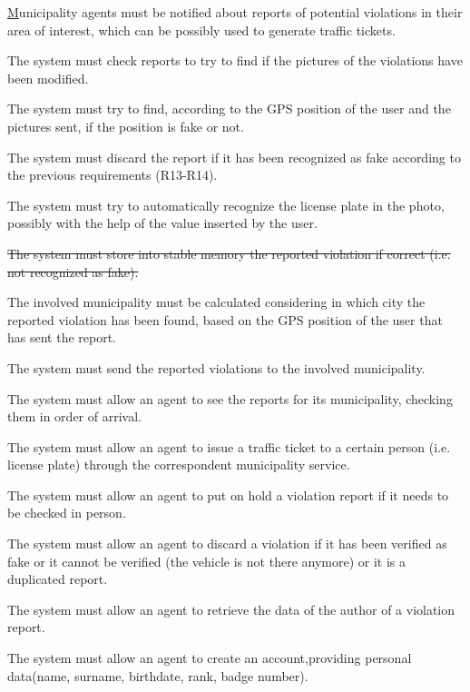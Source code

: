 \documentclass[a4paper]{report}
\begin{document}
\begin{enumerate}[start=1,label={[G\arabic*]}]
\item \hyperref[G2] Municipality agents must be notified about reports of potential violations in their area of interest, which can be possibly used to generate traffic tickets.	
\begin{enumerate}[start=13,label={[R\arabic*]}]
\item \label{R13}The system must check reports to try to find if the pictures of the violations have been modified.
\item \label{R14}The system must try to find, according to the GPS position of the user and the pictures sent, if the position is fake or not.
\item \label{R15}The system must discard the report if it has been recognized as fake according to the previous requirements (R13-R14).
\item \label{R16}The system must try to automatically recognize the license plate in the photo, possibly with the help of the value inserted by the user.
\item \st{The system must store into stable memory the reported violation if correct (i.e. not recognized as fake). }
\item \label{R18}The involved municipality must be calculated considering in which city the reported violation has been found, based on the GPS position of the user that has sent the report.
\item \label{R19}The system must send the reported violations to the involved municipality.
\item \label{R20}The system must allow an agent to see the reports for its municipality, checking them in order of arrival.
\item \label{R21}The system must allow an agent to issue a traffic ticket to a certain person (i.e. license plate) through the correspondent municipality service.
\item \label{R22}The system must allow an agent to put on hold a violation report if it needs to be checked in person.
\item \label{R23}The system must allow an agent to discard a violation if it has been verified as fake or it cannot be verified (the vehicle is not there anymore) or it is a duplicated report.
\item \label{R24}The system must allow an agent to retrieve the data of the author of a violation report.
\item \label{R25}The system must allow an agent to create an account,providing personal data(name, surname, birthdate, rank, badge number).

\end{enumerate}
\end{enumerate}
\end{document}
